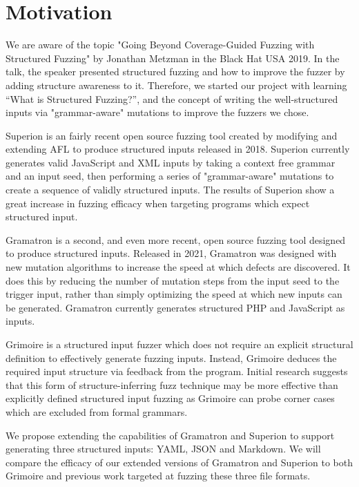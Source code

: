 \documentclass[12pt]{diazessay}
\begin{document}
\section*{Motivation}
We are aware of the topic "Going Beyond Coverage-Guided Fuzzing with Structured Fuzzing" by Jonathan Metzman in the Black Hat USA 2019\cite{blackhat2019}.
In the talk, the speaker presented structured fuzzing and how to improve the fuzzer by adding structure awareness to it. 
Therefore, we started our project with learning “What is Structured Fuzzing?”, and the concept of writing the well-structured inputs via "grammar-aware" mutations to improve the fuzzers we chose.


Superion\cite{superion} is an fairly recent open source fuzzing tool created by modifying and extending AFL to produce structured inputs released in 2018.
Superion currently generates valid JavaScript and XML inputs by taking a context free grammar and an input seed, then performing a series of "grammar-aware" mutations to create a sequence of validly structured inputs.
The results of Superion show a great increase in fuzzing efficacy when targeting programs which expect structured input.

Gramatron\cite{srivastava2021gramatron} is a second, and even more recent, open source fuzzing tool designed to produce structured inputs.
Released in 2021, Gramatron was designed with new mutation algorithms to increase the speed at which defects are discovered.
It does this by reducing the number of mutation steps from the input seed to the trigger input, rather than simply optimizing the speed at which new inputs can be generated.
Gramatron currently generates structured PHP and JavaScript as inputs.

Grimoire\cite{GRIMOIRE} is a structured input fuzzer which does not require an explicit structural definition to effectively generate fuzzing inputs.
Instead, Grimoire deduces the required input structure via feedback from the program.
Initial research suggests that this form of structure-inferring fuzz technique may be more effective than explicitly defined structured input fuzzing as Grimoire can probe corner cases which are excluded from formal grammars.

We propose extending the capabilities of Gramatron and Superion to support generating three structured inputs: YAML\cite{YAMLdraft}, JSON and Markdown.
We will compare the efficacy of our extended versions of Gramatron and Superion to both Grimoire and previous work targeted at fuzzing these three file formats.
\end{document}

